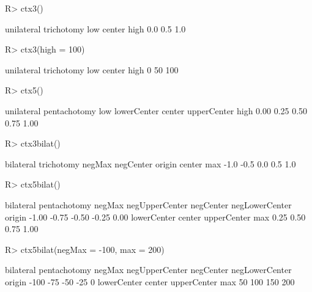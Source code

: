 \begin{Schunk}
% --begin: "ctx"
\begin{Sinput}
R> ctx3()
\end{Sinput}
\begin{Soutput}
unilateral trichotomy
   low center   high 
   0.0    0.5    1.0 
\end{Soutput}
\begin{Sinput}
R> ctx3(high = 100)
\end{Sinput}
\begin{Soutput}
unilateral trichotomy
   low center   high 
     0     50    100 
\end{Soutput}
\begin{Sinput}
R> ctx5()
\end{Sinput}
\begin{Soutput}
unilateral pentachotomy
        low lowerCenter      center upperCenter        high 
       0.00        0.25        0.50        0.75        1.00 
\end{Soutput}
\begin{Sinput}
R> ctx3bilat()
\end{Sinput}
\begin{Soutput}
bilateral trichotomy
   negMax negCenter    origin    center       max 
     -1.0      -0.5       0.0       0.5       1.0 
\end{Soutput}
\begin{Sinput}
R> ctx5bilat()
\end{Sinput}
\begin{Soutput}
bilateral pentachotomy
        negMax negUpperCenter      negCenter negLowerCenter         origin 
         -1.00          -0.75          -0.50          -0.25           0.00 
   lowerCenter         center    upperCenter            max 
          0.25           0.50           0.75           1.00 
\end{Soutput}
\begin{Sinput}
R> ctx5bilat(negMax = -100, max = 200)
\end{Sinput}
\begin{Soutput}
bilateral pentachotomy
        negMax negUpperCenter      negCenter negLowerCenter         origin 
          -100            -75            -50            -25              0 
   lowerCenter         center    upperCenter            max 
            50            100            150            200 
\end{Soutput}
% --end: "ctx"
\end{Schunk}
